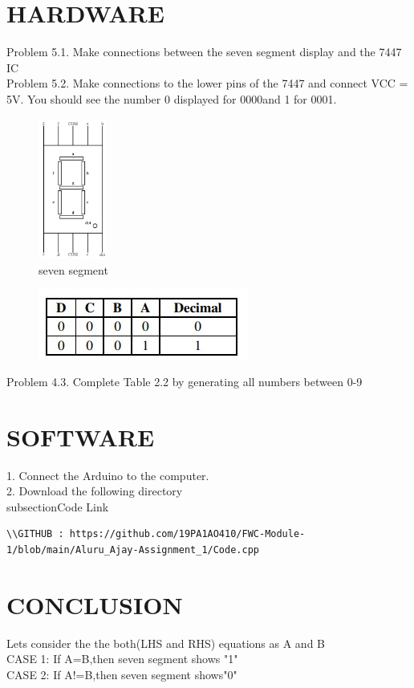 \documentclass[10pt, a4paper]{article}
\begin{document}
\section{HARDWARE}
Problem 5.1. Make connections between the seven segment display  and the 7447 IC
\\Problem 5.2. Make connections to the lower pins of the 7447  and connect VCC = 5V. You should see the number 0 displayed for 0000and 1 for 0001.


\begin{figure}[h]
    \centering
    \includegraphics[width=0.2\textwidth]{7segpo.jpg}
    \caption{seven segment}
    \label{fig:my_label}
\end{figure}


\begin{figure}[h]
    \centering
    \includegraphics{decimal.jpg}
    \caption{}
\end{figure}  
  
Problem 4.3. Complete Table 2.2 by generating all
numbers between 0-9
\section{SOFTWARE}

1. Connect the Arduino to the computer.
\\2. Download the following directory
\\subsection{Code Link} 
\vspace{5mm} 
\begin{lstlisting} 
\\GITHUB : https://github.com/19PA1AO410/FWC-Module-1/blob/main/Aluru_Ajay-Assignment_1/Code.cpp
\end{lstlisting} 

\section{CONCLUSION}
Lets consider the the both(LHS and RHS) equations as A and B
\\CASE 1: If A=B,then seven segment shows "1"
\\CASE 2: If A!=B,then seven segment shows"0"
\end{document}
